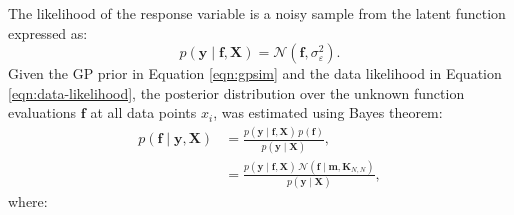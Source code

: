 \documentclass[letterpaper]{article}
\begin{document}
The likelihood of the response variable is a noisy sample from the latent function expressed as:
\begin{equation}\label{eqn:data-likelihood}
p(\textbf{y} \mid \textbf{f}, \textbf{X}) = \mathcal{N}(\textbf{f}, \sigma_{\varepsilon}^2).
\end{equation}
Given the GP prior in Equation \eqref{eqn:gpsim} and the data likelihood in Equation \eqref{eqn:data-likelihood}, the posterior distribution over the unknown function evaluations \(\textbf{f}\) at all data points \(x_i\), was estimated using Bayes theorem: 
\begin{equation}\label{eqn:bayesinfty}
\begin{aligned}
p(\textbf{f} \mid \textbf{y},\textbf{X}) &= \frac{p(\textbf{y} \mid \textbf{f}, \textbf{X}) \, p(\textbf{f})}{p(\textbf{y} \mid \textbf{X})}, \\
&= \frac{p(\textbf{y} \mid \textbf{f}, \textbf{X}) \, \mathcal{N}(\textbf{f} \mid \textbf{m}, \textbf{K}_{N,N})}{p(\textbf{y} \mid \textbf{X})},
\end{aligned}
\end{equation}
where:
\end{document}
